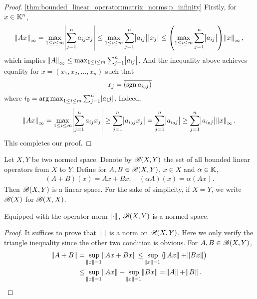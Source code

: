\begin{proof}
\ref{thm:bounded_linear_operator:matrix_norms:p_infinity}
Firstly, for $x \in \mathbb{K}^n$, 
\begin{equation*}
    \norm{Ax}_\infty = \max_{1 \le i \le m} \abs{\sum_{j=1}^{n} a_{ij} x_j} 
    \le \max_{1 \le i \le m} \sum_{j=1}^{n} \abs{a_{ij}} \abs{x_j} 
    \le \left( \max_{1 \le i \le m} \sum_{j=1}^{n} \abs{a_{ij}} \right) 
        \norm{x}_\infty, 
\end{equation*}
which implies $\norm{A}_\infty \le \max_{1 \le i \le m} \sum_{j=1}^{n} 
\abs{a_{ij}}$. 
And the inequality above achieves equality for $x = \left(x_1, x_2, 
\ldots, x_n \right)$ such that 
\begin{equation*}
x_j = \overline{(\operatorname{sgn} a_{i_0j})}
\end{equation*} 
where $i_0 = \operatorname*{arg\,max}_{1 \le i \le m} \sum_{j=1}^{n} \abs{a_ij}$. 
Indeed, 
\begin{equation*}
    \begin{aligned}
        \norm{Ax}_\infty = \max_{1 \le i \le m} \abs{\sum_{j=1}^{n} a_{ij} x_j} 
        \ge \sum_{j=1}^{n} \abs{a_{i_0j} x_j} 
        = \sum_{j=1}^{n} \abs{a_{i_0j}} 
        \ge \sum_{j=1}^{n} \abs{a_{i_0j}} \norm{x}_\infty.
    \end{aligned}
\end{equation*}
This completes our proof. 
\end{proof}

Let $X, Y$ be two normed space. 
Denote by $\mathscr{B}(X, Y)$ the set of all bounded linear operators from $X$ to 
$Y$. 
Define for $A, B \in \mathscr{B}(X, Y)$, $x \in X$ and $\alpha \in \mathbb{K}$, 
\begin{equation*}
    \begin{aligned}
        (A + B)(x) = Ax + Bx, \quad
        (\alpha A)(x) = \alpha (Ax). 
    \end{aligned}
\end{equation*}
Then $\mathscr{B}(X, Y)$ is a linear space. 
For the sake of simplicity, if $X = Y$, we write $\mathscr{B}(X)$ for $\mathscr{B}(X, X)$. 

\begin{thm}
Equipped with the operator norm $\norm{\mathord{\cdot}}$, $\mathscr{B} (X, Y)$ is a normed 
space. 
\end{thm}
\begin{proof}
It suffices to prove that $\norm{\mathord{\cdot}}$ is a norm on $\mathscr{B}(X, Y)$. 
Here we only verify the triangle inequality since the other two condition 
is obvious. 
For $A, B \in \mathscr{B}(X, Y)$, 
\begin{equation*}
    \begin{aligned}
        \norm{A + B} &= \sup_{\norm{x} = 1} \norm{Ax + Bx} 
        \le \sup_{\norm{x} = 1} \left( \norm{Ax} + \norm{Bx} \right) \\
        &\le \sup_{\norm{x} = 1} \norm{Ax} + \sup_{\norm{x} = 1} \norm{Bx} 
        = \norm{A} + \norm{B}. 
    \end{aligned}
\end{equation*}
\end{proof}

